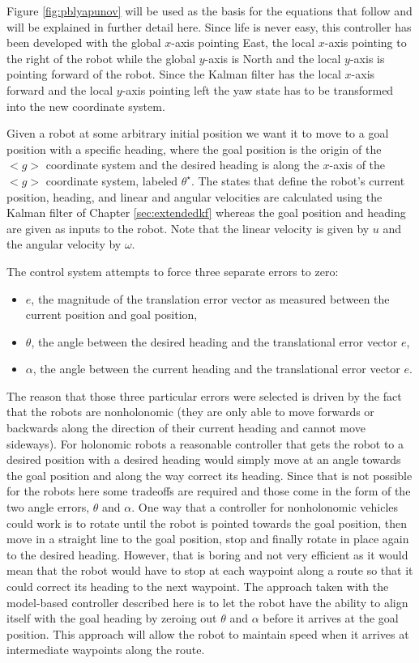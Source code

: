 Figure \ref{fig:pblyapunov} will be used as the basis for the equations that follow and will be explained in further detail here. Since life is never easy, this controller has been developed with the global $x$-axis pointing East, the local $x$-axis pointing to the right of the robot while the global $y$-axis is North and the local $y$-axis is pointing forward of the robot. Since the Kalman filter has the local $x$-axis forward and the local $y$-axis pointing left the yaw state has to be transformed into the new coordinate system.

Given a robot at some arbitrary initial position we want it to move to a goal position with a specific heading, where the goal position is the origin of the $<g>$ coordinate system and the desired heading is along the $x$-axis of the $<g>$ coordinate system, labeled $\theta^\star$. The states that define the robot's current position, heading, and linear and angular velocities are calculated using the Kalman filter of Chapter \ref{sec:extendedkf} whereas the goal position and heading are given as inputs to the robot. Note that the linear velocity is given by $u$ and the angular velocity by $\omega$.

The control system attempts to force three separate errors to zero:
\begin{itemize}
\item $e$, the magnitude of the translation error vector as measured between the current position and goal position,
\item $\theta$, the angle between the desired heading and the translational error vector $e$,
\item $\alpha$, the angle between the current heading and the translational error vector $e$.
\end{itemize}

The reason that those three particular errors were selected is driven by the fact that the robots are nonholonomic (they are only able to move forwards or backwards along the direction of their current heading and cannot move sideways). For holonomic robots a reasonable controller that gets the robot to a desired position with a desired heading would simply move at an angle towards the goal position and along the way correct its heading. Since that is not possible for the robots here some tradeoffs are required and those come in the form of the two angle errors, $\theta$ and $\alpha$. One way that a controller for nonholonomic vehicles could work is to rotate until the robot is pointed towards the goal position, then move in a straight line to the goal position, stop and finally rotate in place again to the desired heading. However, that is boring and not very efficient as it would mean that the robot would have to stop at each waypoint along a route so that it could correct its heading to the next waypoint. The approach taken with the model-based controller described here is to let the robot have the ability to align itself with the goal heading by zeroing out $\theta$ and $\alpha$ before it arrives at the goal position. This approach will allow the robot to maintain speed when it arrives at intermediate waypoints along the route.

